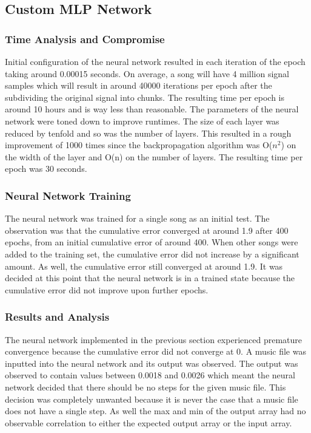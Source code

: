 \subsection{Custom MLP Network}

\subsubsection{Time Analysis and Compromise}
Initial configuration of the neural network resulted in each iteration of the epoch taking around 0.00015 seconds. On average, a song will have 4 million signal samples which will result in around 40000 iterations per epoch after the subdividing the original signal into chunks. The resulting time per epoch is around 10 hours and is way less than reasonable. The parameters of the neural network were toned down to improve runtimes. The size of each layer was reduced by tenfold and so was the number of layers. This resulted in a rough improvement of 1000 times since the backpropagation algorithm was O($n^2$) on the width of the layer and O(n) on the number of layers. The resulting time per epoch was 30 seconds.\\

\subsubsection{Neural Network Training}
The neural network was trained for a single song as an initial test. The observation was that the cumulative error converged at around 1.9 after 400 epochs, from an initial cumulative error of around 400. When other songs were added to the training set, the cumulative error did not increase by a significant amount. As well, the cumulative error still converged at around 1.9. It was decided at this point that the neural network is in a trained state because the cumulative error did not improve upon further epochs. \\

\subsubsection{Results and Analysis}
The neural network implemented in the previous section experienced premature convergence because the cumulative error did not converge at 0. A music file was inputted into the neural network and its output was observed. The output was observed to contain values between 0.0018 and 0.0026 which meant the neural network decided that there should be no steps for the given music file. This decision was completely unwanted because it is never the case that a music file does not have a single step. As well the max and min of the output array had no observable correlation to either the expected output array or the input array.\\


